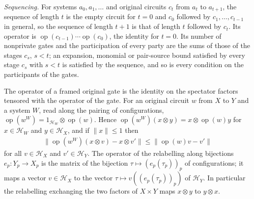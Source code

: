 \begin{definition}
    \emph{Sequencing.} For systems $a_0,a_1,\dots$ and original circuits $c_t$ from $a_t$ to
    $a_{t+1}$, the sequence of length $t$ is the empty circuit for $t=0$ and $c_0$ followed by
    $c_1,\dots,c_{t-1}$ in general, so the sequence of length $t+1$ is that of length $t$
    followed by $c_t$. Its operator is $\operatorname{op}(c_{t-1})\cdots\operatorname{op}(c_0)$,
    the identity for $t=0$. Its number of nonprivate gates and the participation of every party
    are the sums of those of the stages $c_s$, $s<t$; an expansion, monomial or pair-source
    bound satisfied by every stage $c_s$ with $s<t$ is satisfied by the sequence, and so is
    every condition on the participants of the gates.
\end{definition}

\begin{theorem}
    \label{thm:party_frame_prod_vec}
    \leanok
    The operator of a framed original gate is the identity on the spectator factors tensored
    with the operator of the gate. For an original circuit $w$ from $X$ to $Y$ and a system $W$,
    read along the pairing of configurations,
    $\operatorname{op}(w^W)=1_{\mathcal H_W}\otimes\operatorname{op}(w)$. Hence
    $\operatorname{op}(w^W)(x\otimes y)=x\otimes\operatorname{op}(w)y$ for
    $x\in\mathcal H_W$ and $y\in\mathcal H_X$, and if $\lVert x\rVert\leq1$ then
    \begin{align}
        \lVert\operatorname{op}(w^W)(x\otimes v)-x\otimes v'\rVert
        \leq\lVert\operatorname{op}(w)v-v'\rVert
    \end{align}
    for all $v\in\mathcal H_X$ and $v'\in\mathcal H_Y$. The operator of the relabelling along
    bijections $e_p:Y_p\to X_p$ is the matrix of the bijection $\tau\mapsto(e_p(\tau_p))_p$ of
    configurations; it maps a vector $v\in\mathcal H_X$ to the vector
    $\tau\mapsto v((e_p(\tau_p))_p)$ of $\mathcal H_Y$. In particular the relabelling exchanging
    the two factors of $X\times Y$ maps $x\otimes y$ to $y\otimes x$.
\end{theorem}
